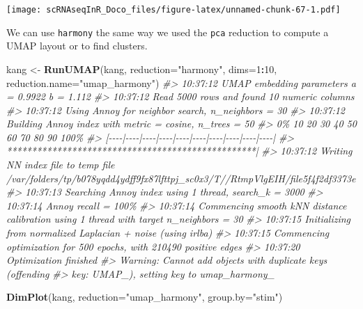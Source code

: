 \documentclass[
]{book}
\newenvironment{Shaded}{\begin{snugshade}}{\end{snugshade}}
\newcommand{\AttributeTok}[1]{\textcolor[rgb]{0.13,0.29,0.53}{#1}}
\newcommand{\CommentTok}[1]{\textcolor[rgb]{0.56,0.35,0.01}{\textit{#1}}}
\newcommand{\DecValTok}[1]{\textcolor[rgb]{0.00,0.00,0.81}{#1}}
\newcommand{\FunctionTok}[1]{\textcolor[rgb]{0.13,0.29,0.53}{\textbf{#1}}}
\newcommand{\NormalTok}[1]{#1}
\newcommand{\OtherTok}[1]{\textcolor[rgb]{0.56,0.35,0.01}{#1}}
\newcommand{\SpecialCharTok}[1]{\textcolor[rgb]{0.81,0.36,0.00}{\textbf{#1}}}
\newcommand{\StringTok}[1]{\textcolor[rgb]{0.31,0.60,0.02}{#1}}
\begin{document}
\texttt{[image: scRNAseqInR\_Doco\_files/figure-latex/unnamed-chunk-67-1.pdf]}

We can use \texttt{harmony} the same way we used the \texttt{pca} reduction to compute a UMAP layout or to find clusters.

\begin{Shaded}
\begin{Highlighting}[]
\NormalTok{kang }\OtherTok{\textless{}{-}} \FunctionTok{RunUMAP}\NormalTok{(kang, }\AttributeTok{reduction=}\StringTok{"harmony"}\NormalTok{, }\AttributeTok{dims=}\DecValTok{1}\SpecialCharTok{:}\DecValTok{10}\NormalTok{, }\AttributeTok{reduction.name=}\StringTok{"umap\_harmony"}\NormalTok{)}
\CommentTok{\#\textgreater{} 10:37:12 UMAP embedding parameters a = 0.9922 b = 1.112}
\CommentTok{\#\textgreater{} 10:37:12 Read 5000 rows and found 10 numeric columns}
\CommentTok{\#\textgreater{} 10:37:12 Using Annoy for neighbor search, n\_neighbors = 30}
\CommentTok{\#\textgreater{} 10:37:12 Building Annoy index with metric = cosine, n\_trees = 50}
\CommentTok{\#\textgreater{} 0\%   10   20   30   40   50   60   70   80   90   100\%}
\CommentTok{\#\textgreater{} [{-}{-}{-}{-}|{-}{-}{-}{-}|{-}{-}{-}{-}|{-}{-}{-}{-}|{-}{-}{-}{-}|{-}{-}{-}{-}|{-}{-}{-}{-}|{-}{-}{-}{-}|{-}{-}{-}{-}|{-}{-}{-}{-}|}
\CommentTok{\#\textgreater{} **************************************************|}
\CommentTok{\#\textgreater{} 10:37:12 Writing NN index file to temp file /var/folders/tp/b078yqdd4ydff9fx87lfttpj\_sc0x3/T//RtmpVlgEIH/file5f4f2df3373e}
\CommentTok{\#\textgreater{} 10:37:13 Searching Annoy index using 1 thread, search\_k = 3000}
\CommentTok{\#\textgreater{} 10:37:14 Annoy recall = 100\%}
\CommentTok{\#\textgreater{} 10:37:14 Commencing smooth kNN distance calibration using 1 thread with target n\_neighbors = 30}
\CommentTok{\#\textgreater{} 10:37:15 Initializing from normalized Laplacian + noise (using irlba)}
\CommentTok{\#\textgreater{} 10:37:15 Commencing optimization for 500 epochs, with 210490 positive edges}
\CommentTok{\#\textgreater{} 10:37:20 Optimization finished}
\CommentTok{\#\textgreater{} Warning: Cannot add objects with duplicate keys (offending}
\CommentTok{\#\textgreater{} key: UMAP\_), setting key to \textquotesingle{}umap\_harmony\_\textquotesingle{}}

\FunctionTok{DimPlot}\NormalTok{(kang, }\AttributeTok{reduction=}\StringTok{"umap\_harmony"}\NormalTok{, }\AttributeTok{group.by=}\StringTok{"stim"}\NormalTok{)}
\end{Highlighting}
\end{Shaded}
\end{document}
